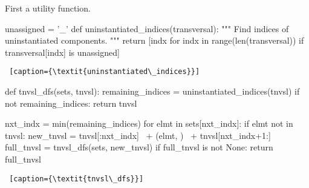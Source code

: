 First a utility function.
\begin{center}
\begin{minipage}[c]{0.45\textwidth}
\begin{python1}  
unassigned = '_'
def uninstantiated_indices(transversal):
  """ Find indices of uninstantiated components. """
  return [indx for indx in range(len(transversal)) 
               if transversal[indx] is unassigned]
\end{python1}\linv
\begin{lstlisting} [caption={\textit{uninstantiated\_indices}}]
\end{lstlisting}
\end{minipage}

\begin{minipage}[c]{0.45\textwidth}
\begin{python1}  
def tnvsl_dfs(sets, tnvsl):
  remaining_indices = uninstantiated_indices(tnvsl)
  if not remaining_indices: return tnvsl

  nxt_indx = min(remaining_indices)
  for elmt in sets[nxt_indx]:
    if elmt not in tnvsl:
      new_tnvsl = tnvsl[:nxt_indx] \
                  + (elmt, ) \
                  + tnvsl[nxt_indx+1:]
      full_tnvsl = tnvsl_dfs(sets, new_tnvsl)
      if full_tnvsl is not None: return full_tnvsl
\end{python1}\linv
\begin{lstlisting} [caption={\textit{tnvsl\_dfs}}]
\end{lstlisting}
\end{minipage}
\end{center}

